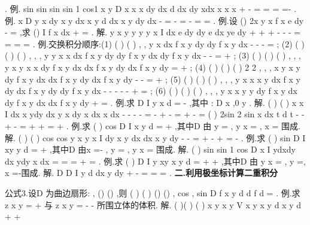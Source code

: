 \int \int 
\int 
. 
\textcolor{lyred}{例}.
sin
sin
sin
sin
1 cos1
x
y
D
x
x
x
dy
dx
d
dx
dy
xdx
x
x
x
\sigma 
+
-
=
=
=
=-
\int 
\int 
\int \int 
\int 
\int 
\int 
. 
\textcolor{lyred}{例}.
x
D
y
x
dy
x
y dx
x
y d
dx
x
y dy
dx
\pi 
\pi 
\sigma 
-
=
-
=
-
=
=
\int 
\int 
\int \int 
\int 
\int 
\int 
. 
\textcolor{lyred}{例}.设
()
2x
y
x
f x
e
dy
-
=\int 
,求
()
I
f x dx
+\infty 
=\int 
. 
解.
y
x
y
y
y
y
x
I
dx
e
dy
dy e
dx
ye
dy
+\infty 
+\infty 
+\infty 
-
-
-
=
=
=
=
\int 
\int 
\int 
\int 
\int 
. 
\textcolor{lyred}{例}.交换积分顺序:(1)
(
)
(
)
,
,
y
x
dx
f x y dy
dy
f x y dx
-
-
-
=
\int 
\int 
\int 
\int 
; 
(2)
(
)
(
)
(
)
,
,
,
y
y
x
x
dx
f x y dy
dy
f x y dx
dy
f x y dx
-
-
=
+
\int 
\int 
\int 
\int 
\int 
\int 
; 
(3)
(
)
(
)
(
)
,
,
,
y
x
y
x
x
dy
f x y dx
dx
f x y dy
dx
f x y dy
=
+
\int 
\int 
\int 
\int 
\int 
\int 
; 
(4)
(
)
(
)
(
)
2 2
,
,
,
x
y
x
y
dy
f x y dx
dx
f x y dy
dx
f x y dy
-
-
=
+
\int 
\int 
\int 
\int 
\int 
\int 
; 
(5)
(
)
(
)
(
)
,
,
,
y
x x
x
y
dx
f x y dy
dx
f x y dy
dy
f x y dx
-
-
-
-
-
+
=
\int 
\int 
\int 
\int 
\int 
\int 
; 
(6)
(
)
(
)
(
)
,
,
,
y
x
x
y
y
dy
f x y dx
dy
f x y dx
dx
f x y dy
+
=
\int 
\int 
\int 
\int 
\int 
\int 
. 
\textcolor{lyred}{例}.求
D
I
y
x d\sigma 
=
-
\int \int 
,其中
:
D x \le ,0
y
\le 
\le 
. 
解.
(
)
(
)
x
x
I
dx
x
ydy
dx
y
x dy
x
dx
x
dx
-
-
-
-
=
-
+
-
=
+
-
=
\int 
\int 
\int 
\int 
\int 
\int 
(
)
2sin
2 sin
x dx
t
d
t
\pi 
\pi 
\pi 
\pi 
-
-
+
-
=
+
+
=
+
\int 
\int 
. 
\textcolor{lyred}{例}.求
(
)
cos
D
I
x
y d\sigma 
=
+
\int \int 
,其中D 由
y =
, y
x
=
,
x
\pi 
=
围成. 
解.
(
)
(
)
cos
cos
y
x
y
x
I
dy
x
y dx
dx
x
y dy
\pi 
\pi 
\pi 
\pi 
\pi 
\pi 
-
-
=
+
-
+
=
-
\int 
\int 
\int 
\int 
. 
\textcolor{lyred}{例}.求
(
)
sin
D
I
xy
y d\sigma 
=
+
\int \int 
,其中D 由x
\pi 
=-
, y
\pi 
=
, y
x
=
围成. 
解.
(
)
sin
sin
1 cos
D
x
I
ydxdy
dx
ydy
x dx
\pi 
\pi 
\pi 
\pi 
=
=
=
+
=
\int \int 
\int \int 
\int 
. 
\textcolor{lyred}{例}.求
(
)
D
I
y
xy
x
y
d\sigma 
=
+
\cdots 
+
\int \int 
,其中D 由
y
x
=
,
y =,
x =-围成. 
解.
D
D
I
y d
dx y dy
\sigma 
+
-
=
=
=
\int \int 
\int 
\int 
. 
\vspace{4pt}
{\bfseries \textcolor{lyred}{二.利用极坐标计算二重积分}}

\textcolor{lyred}{公式3}.设D 为曲边扇形:\alpha 
\theta 
\beta 
\le 
\le 
,
()
()
\rho \theta 
\rho 
\rho 
\theta 
\le 
\le 
,则 
(
)
(
)
()
()
,
cos ,
sin
D
f x y d
d
f
d
\rho 
\theta 
\beta 
\alpha 
\rho \theta 
\sigma 
\theta 
\rho 
\theta \rho 
\theta \rho \rho 
=
\int \int 
\int 
\int 
. 
\textcolor{lyred}{例}.求
z
x
y
=
+
与
z
x
y
=
-
-
所围立体的体积. 
解.
(
)(
)
(
)
x
y
x
y
V
x
y
x
y
d
x
y
d
\sigma 
\sigma 
+
\le 
+
\le 



